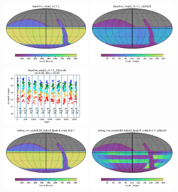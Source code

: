 \documentclass[modern]{aastex62}
\begin{document}
\begin{figure}
\includegraphics[height=1.25in, width=1.75in]{plots/baseline_nexp2_v1.7.1/baseline_nexp2_v1_7_1_Count_HEAL_SkyMap.pdf}
\includegraphics[height=1.25in, width=1.75in]{plots/baseline_nexp2_v1.7.1/baseline_nexp2_v1_7_1_Count_night_gt_913_125000_and_night_lt_1278_375000_and_note_not_like_DD_HEAL_SkyMap.pdf}
\includegraphics[height=1.25in, width=1.75in]{plots/baseline_nexp2_v171_spotc.pdf}\\
\includegraphics[height=1.25in, width=1.75in]{plots/rolling_nm_scale0.90_nslice2_fpw0.9_nrw1.0v1.7/rolling_nm_scale0_90_nslice2_fpw0_9_nrw1_0v1_7_Count_HEAL_SkyMap.pdf}
\includegraphics[height=1.25in, width=1.75in]{plots/rolling_nm_scale0.90_nslice2_fpw0.9_nrw1.0v1.7/rolling_nm_scale0_90_nslice2_fpw0_9_nrw1_0v1_7_Count_night_gt_913_125000_and_night_lt_1278_375000_and_note_not_like_DD_HEAL_SkyMap.pdf}

\end{figure}
\end{document}
